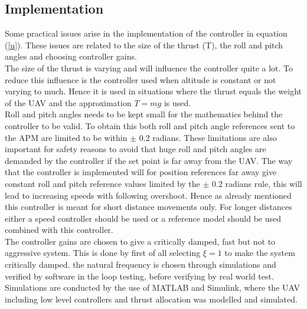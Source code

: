 \subsection{Implementation}
Some practical issues arise in the implementation of the controller in equation (\ref{u}). These issues are related to the size of the thrust (T), the roll and pitch angles and choosing controller gains.\\
\newline
The size of the thrust is varying and will influence the controller quite a lot. To reduce this influence is the controller used when altitude is constant or not varying to much. Hence it is used in situations where the thrust equals the weight of the UAV and the approximation $T = mg$ is used.\\
\newline
Roll and pitch angles needs to be kept small for the mathematics behind the controller to be valid. To obtain this both roll and pitch angle references sent to the APM are limited to be within $\pm$ 0.2 radians. These limitations are also important for safety reasons to avoid that huge roll and pitch angles are demanded by the controller if the set point is far away from the UAV. The way that the controller is implemented will for position references far away give constant roll and pitch reference values limited by the $\pm$ 0.2 radians rule, this will lead to increasing speeds with following overshoot. Hence as already mentioned this controller is meant for short distance movements only. For longer distances either a speed controller should be used or a reference model should be used combined with this controller.\\
\newline
The controller gains are chosen to give a critically damped, fast but not to aggressive system. This is done by first of all selecting $\xi = 1$ to make the system critically damped. the natural frequency is chosen through simulations and verified by software in the loop testing, before verifying by real world test. Simulations are conducted by the use of MATLAB and Simulink, where the UAV including low level controllers and thrust allocation was modelled and simulated.
